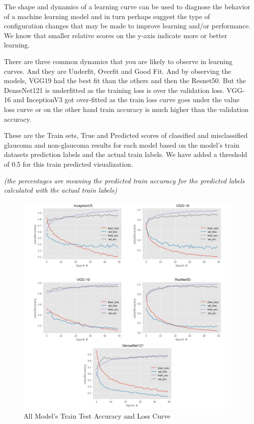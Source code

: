 \documentclass[conference]{IEEEtran}
\begin{document}
\noindent The shape and dynamics of a learning curve can be used to diagnose the behavior of a machine learning model and in turn perhaps suggest the type of configuration changes that may be made to improve learning and/or performance. We know that smaller relative scores on the y-axis indicate more or better learning.

\noindent There are three common dynamics that you are likely to observe in learning curves. And they are Underfit, Overfit and Good Fit.  And by observing the models, VGG19 had the best fit than the others and then the Resnet50. But the DenseNet121 is underfitted as the training loss is over the validation loss. VGG-16 and InceptionV3 got over-fitted as the train loss curve  goes under the value loss curve or on the other hand train accuracy is much higher than the validation accuracy.

\noindent These are the Train sets, True and Predicted scores of classified and misclassified glaucoma and non-glaucoma results for each model based on the model’s train datasets prediction labels and the actual train labels. We have added a threshold of 0.5 for this train predicted visualization.

\noindent\textit{(the percentages are meaning the predicted train accuracy for the predicted labels calculated with the actual train labels)}

\vspace{5mm}
\begin{figure}[hbt!]
\centering
\includegraphics[scale=0.5]{fig-35.png}
\caption{All Model’s Train Test Accuracy and Loss Curve}
\end{figure}
\end{document}
